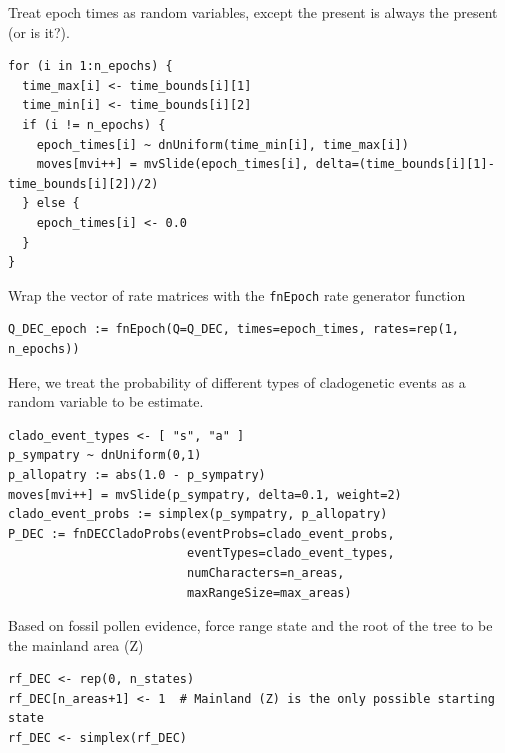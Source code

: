 Treat epoch times as random variables, except the present is always the present (or is it?).

\begin{snugshade}
\begin{lstlisting}
for (i in 1:n_epochs) {
  time_max[i] <- time_bounds[i][1]
  time_min[i] <- time_bounds[i][2]
  if (i != n_epochs) {
    epoch_times[i] ~ dnUniform(time_min[i], time_max[i])
    moves[mvi++] = mvSlide(epoch_times[i], delta=(time_bounds[i][1]-time_bounds[i][2])/2)
  } else {
    epoch_times[i] <- 0.0
  }
}
\end{lstlisting}
\end{snugshade}

Wrap the vector of rate matrices with the {\tt fnEpoch} rate generator function

\begin{snugshade}
\begin{lstlisting}
Q_DEC_epoch := fnEpoch(Q=Q_DEC, times=epoch_times, rates=rep(1, n_epochs))
\end{lstlisting}
\end{snugshade}


Here, we treat the probability of different types of cladogenetic events as a random variable to be estimate.

\begin{snugshade}
\begin{lstlisting}
clado_event_types <- [ "s", "a" ]
p_sympatry ~ dnUniform(0,1)
p_allopatry := abs(1.0 - p_sympatry)
moves[mvi++] = mvSlide(p_sympatry, delta=0.1, weight=2)
clado_event_probs := simplex(p_sympatry, p_allopatry)
P_DEC := fnDECCladoProbs(eventProbs=clado_event_probs,
                         eventTypes=clado_event_types,
                         numCharacters=n_areas,
                         maxRangeSize=max_areas)
\end{lstlisting}
\end{snugshade}

Based on fossil pollen evidence, force range state and the root of the tree to be the mainland area (Z)

\begin{snugshade}
\begin{lstlisting}
rf_DEC <- rep(0, n_states)
rf_DEC[n_areas+1] <- 1  # Mainland (Z) is the only possible starting state
rf_DEC <- simplex(rf_DEC)
\end{lstlisting}
\end{snugshade}



